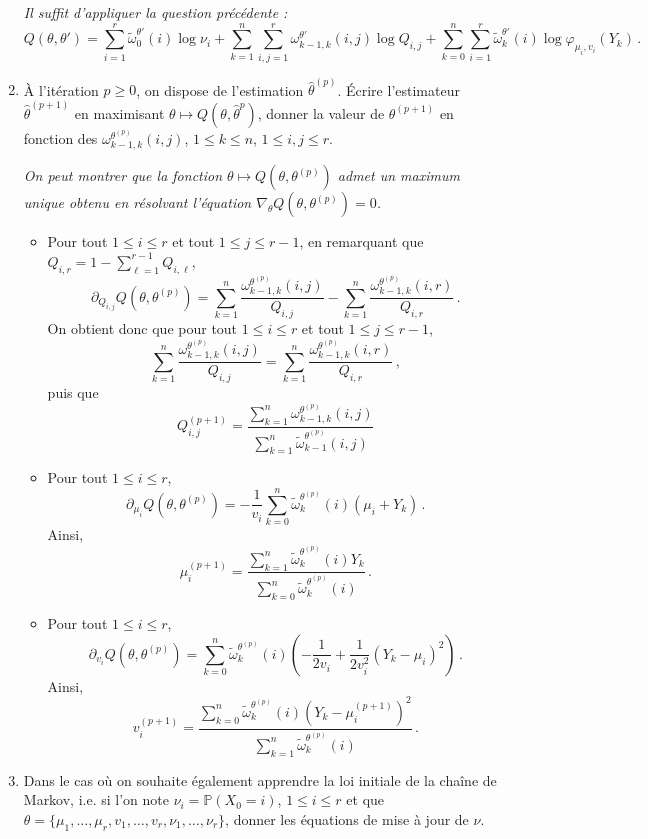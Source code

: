 \documentclass[a4paper,10pt,fleqn]{article}
\newcommand{\1}{\ensuremath{\mathbbm{1}}}
\begin{document}
\begin{enumerate}
\vspace{.2cm}

{\em
Il suffit d'appliquer la question pr\'ec\'edente :
$$
Q(\theta,\theta') =\sum_{i=1}^r\tilde\omega_{0}^{\theta'}(i)\log \nu_i +  \sum_{k=1}^n\sum_{i,j=1}^r\omega_{k-1,k}^{\theta'}(i,j) \log Q_{i,j} + \sum_{k=0}^n\sum_{i=1}^r\tilde\omega_{k}^{\theta'}(i)\log \varphi_{\mu_i,v_i}(Y_{k})\,.
$$
}
\item \`A l'it\'eration $p\geq 0$, on dispose de l'estimation $\hat\theta^{(p)}$. \'Ecrire l'estimateur $\hat\theta^{(p+1)}$ en maximisant $\theta\mapsto Q(\theta,\hat\theta^{p})$, donner la valeur de $\theta^{(p+1)}$ en fonction des $\omega_{k-1,k}^{\theta^{(p)}}(i,j)$, $1\leq k \leq n$, $1\leq i, j \leq r$.

\vspace{.2cm}

{\em
On peut montrer que la fonction $\theta\mapsto Q(\theta,\theta^{(p)})$ admet un maximum unique obtenu en r\'esolvant l'\'equation $\nabla_\theta Q(\theta,\theta^{(p)}) = 0$.
\begin{itemize}
\item Pour tout $1\leq i \leq r$ et tout $1\leq j \leq r-1$, en remarquant que $ Q_{i,r} = 1 - \sum_{\ell=1}^{r-1}Q_{i,\ell}$, 
$$
\partial_{Q_{i,j}}Q(\theta,\theta^{(p)}) = \sum_{k=1}^n\frac{\omega_{k-1,k}^{\theta^{(p)}}(i,j)}{Q_{i,j}} -  \sum_{k=1}^n\frac{\omega_{k-1,k}^{\theta^{(p)}}(i,r)}{Q_{i,r}}\,.
$$
On obtient donc que pour tout $1\leq i \leq r$ et tout $1\leq j \leq r-1$,
$$
\sum_{k=1}^n\frac{\omega_{k-1,k}^{\theta^{(p)}}(i,j)}{Q_{i,j}} = \sum_{k=1}^n\frac{\omega_{k-1,k}^{\theta^{(p)}}(i,r)}{Q_{i,r}}\,,
$$
puis que
$$
Q^{(p+1)}_{i,j} =\frac{\sum_{k=1}^n\omega_{k-1,k}^{\theta^{(p)}}(i,j)}{\sum_{k=1}^n\tilde \omega_{k-1}^{\theta^{(p)}}(i,j)}
$$
\item Pour tout $1\leq i \leq r$, 
$$
\partial_{\mu_i}Q(\theta,\theta^{(p)}) = -\frac{1}{v_i}\sum_{k=0}^n\tilde\omega_{k}^{\theta^{(p)}}(i)\left(\mu_i + Y_k\right)\,.
$$
Ainsi,
$$
\mu^{(p+1)}_i = \frac{\sum_{k=1}^n\tilde\omega_{k}^{\theta^{(p)}}(i)Y_k}{\sum_{k=0}^n\tilde\omega_{k}^{\theta^{(p)}}(i)}\,.
$$
\item Pour tout $1\leq i \leq r$, 
$$
\partial_{v_i}Q(\theta,\theta^{(p)}) = \sum_{k=0}^n\tilde\omega_{k}^{\theta^{(p)}}(i)\left(-\frac{1}{2v_i} + \frac{1}{2v_i^2}(Y_k-\mu_i)^2\right)\,.
$$
Ainsi,
$$
v^{(p+1)}_i = \frac{\sum_{k=0}^n\tilde\omega_{k}^{\theta^{(p)}}(i)(Y_k-\mu^{(p+1)}_i)^2}{\sum_{k=1}^n\tilde\omega_{k}^{\theta^{(p)}}(i)}\,.
$$
\end{itemize}
}
\item Dans le cas o\`u on souhaite \'egalement apprendre la loi initiale de la cha\^ine de Markov, i.e. si l'on note $\nu_i = \mathbb{P}(X_0=i)$, $1\leq i \leq r$ et que $\theta = \{\mu_1,\ldots,\mu_r,v_1,\ldots,v_r,\nu_1,\ldots,\nu_r\}$, donner les \'equations de mise \`a jour de $\nu$. 


\end{enumerate}
\end{document}

